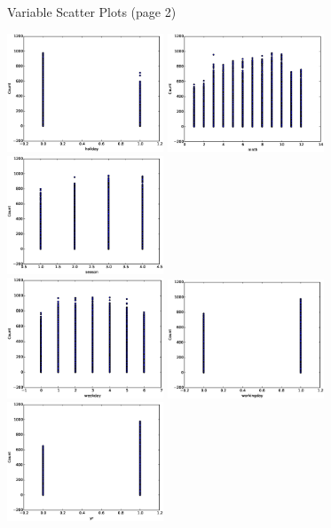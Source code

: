 \documentclass[pdf]{beamer}
\begin{document}

\begin{frame}{Variable Scatter Plots (page 2)}
\begin{center}
\includegraphics[width=0.35\textwidth]{plots/holiday_v_Count_corrcheck.eps}
\includegraphics[width=0.35\textwidth]{plots/mnth_v_Count_corrcheck.eps}
\includegraphics[width=0.35\textwidth]{plots/season_v_Count_corrcheck.eps}\\
\includegraphics[width=0.35\textwidth]{plots/weekday_v_Count_corrcheck.eps}
\includegraphics[width=0.35\textwidth]{plots/workingday_v_Count_corrcheck.eps}
\includegraphics[width=0.35\textwidth]{plots/yr_v_Count_corrcheck.eps}\\
\end{center}
\end{frame}
\end{document}
